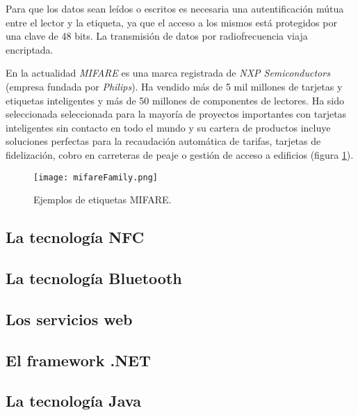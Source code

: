   Para que los datos sean leídos o escritos es necesaria una autentificación 
  mútua entre el lector y la etiqueta, ya que el acceso a los mismos está 
  protegidos por una clave de 48 bits. La transmisión de datos por
  radiofrecuencia viaja encriptada.

  En la actualidad \emph{MIFARE} es una marca registrada de \emph{NXP
  Semiconductors} (empresa fundada por \emph{Philips}). Ha vendido más de 5 mil
  millones de tarjetas y etiquetas inteligentes y más de 50 millones de
  componentes de lectores. Ha sido seleccionada seleccionada para la mayoría
  de proyectos importantes con tarjetas inteligentes sin contacto en todo el
  mundo y su cartera de productos incluye soluciones perfectas para la
  recaudación automática de tarifas, tarjetas de fidelización, cobro en 
  carreteras de peaje o gestión de acceso a edificios\cite{bib:urlMifare} 
  (figura \ref{fig:mifareFamily}).

  \begin{figure}[!h]
    \begin{center}
      \texttt{[image: mifareFamily.png]}
      \caption{Ejemplos de etiquetas MIFARE.}
      \label{fig:mifareFamily}
    \end{center}
  \end{figure}

  \subsection{La tecnología NFC}

  \subsection{La tecnología Bluetooth}

  \subsection{Los servicios web}

  \subsection{El framework .NET}

  \subsection{La tecnología Java}

